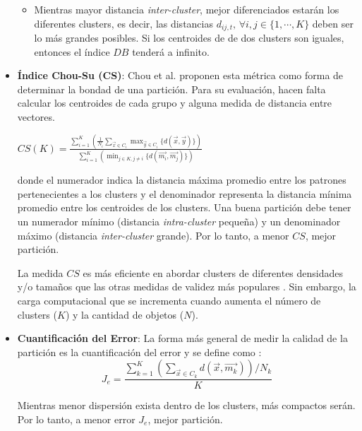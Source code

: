 \begin{itemize}
\begin{itemize}
    \item Mientras mayor distancia \emph{inter-cluster}, mejor diferenciados
estarán los diferentes clusters, es decir, las distancias
$d_{ij, t}\text{, }\forall i,j \in \{1, \cdots, K\}$ deben ser lo más grandes
posibles. Si los centroides de de dos clusters son iguales, entonces el índice
$DB$ tenderá a infinito. 
\end{itemize}

\item \textbf{Índice Chou-Su (CS)}: Chou et al. \cite{SwAjAm2009} proponen esta
métrica como forma de determinar la bondad de una partición. Para su evaluación,
hacen falta calcular los centroides de cada grupo y alguna medida de distancia
entre vectores.

\begin{center}
$ CS(K) = \displaystyle\frac{\displaystyle\sum_{i=1}^K 
                \left(\frac{1}{N_i}\displaystyle\sum_{\overrightarrow{x} \in C_i} \max_{\overrightarrow{y} \in C_i} \{ d(\overrightarrow{x}, \overrightarrow{y})\}\right)}{\displaystyle\sum_{i=1}^K \left(\displaystyle\min_{j \in K, j \neq i} \{ d(\overrightarrow{m_i}, \overrightarrow{m_j})\} \right)}$
\end{center}
donde el numerador indica la distancia máxima promedio entre los patrones
pertenecientes a los clusters y el denominador representa la distancia mínima
promedio entre los centroides de los clusters. Una buena partición debe tener un
numerador mínimo (distancia \emph{intra-cluster} pequeña) y un denominador máximo
(distancia \emph{inter-cluster} grande). Por lo tanto, a menor $CS$, mejor
partición.

La medida $CS$ es más eficiente en abordar clusters de diferentes densidades y/o
tamaños que las otras medidas de validez más populares \cite{DC_6}. Sin embargo,
la carga computacional que se incrementa cuando aumenta el número de clusters
($K$) y la cantidad de objetos ($N$).

\item {\bf Cuantificación del Error}: La forma más general de medir la calidad
de la partición es la cuantificación del error y se define como \cite{PSO_0}:
\begin{equation}\label{cluster: je}
J_e = \displaystyle\frac{\displaystyle\sum_{k = 1}^K \left( \displaystyle\sum_{\overrightarrow{x} \in C_k} d(\overrightarrow{x}, \overrightarrow{m_k}) \right) / N_k}{K}
\end{equation}

    Mientras menor dispersión exista dentro de los clusters, más compactos
serán. Por lo tanto, a menor error $J_e$, mejor partición.
\end{itemize}
